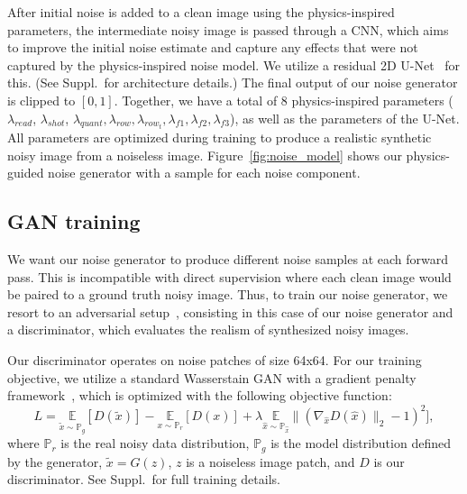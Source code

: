 \documentclass[final]{cvpr}
\begin{document}
After initial noise is added to a clean image using the physics-inspired parameters, the intermediate noisy image is passed through a CNN, which aims to improve the initial noise estimate and capture any effects that were not captured by the physics-inspired noise model. We utilize a residual 2D U-Net~\cite{ronneberger2015u} for this. (See Suppl.\ for architecture details.)
The final output of our noise generator is clipped to $[0,1]$.
Together, we have a total of 8 physics-inspired parameters ($\lambda_{read}$, $\lambda_{shot}$, $\lambda_{quant}, \lambda_{row}, \lambda_{row_t}, \lambda_{f1}, \lambda_{f2}, \lambda_{f3}$), as well as the parameters of the U-Net. All parameters are optimized during training to produce a realistic synthetic noisy image from a noiseless image. Figure~\ref{fig:noise_model} shows our physics-guided noise generator with a sample for each noise component.


















\subsection{GAN training}
We want our noise generator to produce different noise samples at each forward pass. This is incompatible with direct supervision where each clean image would be paired to a ground truth noisy image.
Thus, to train our noise generator, we resort to an adversarial setup~\cite{goodfellow2014}, consisting in this case of our noise generator and a discriminator, which evaluates the realism of synthesized noisy images.

Our discriminator operates on noise patches of size 64x64. For our training objective, we utilize a standard Wasserstain GAN with a gradient penalty framework~\cite{gulrajani2017improved}, which is optimized with  the following objective function:
\begin{equation}
    L = \underset{\tilde{x} \sim \mathbb{P}_g}{\mathbb{E}} [D(\tilde{x})] - \underset{x \sim \mathbb{P}_r}{\mathbb{E}} [D(x)] + \lambda \underset{\hat{x} \sim \mathbb{P}_{\hat{x}}}{\mathbb{E}} \| (\nabla_{\hat{x}} D(\hat{x})\|_2 - 1)^2], 
\end{equation}
where $\mathbb{P}_r$ is the real noisy data distribution, $\mathbb{P}_g$ is the model distribution defined by the generator, $\tilde{x} = G(z)$, $z$ is a noiseless image patch, and $D$ is our discriminator. See Suppl.\ for full training details.
\end{document}

